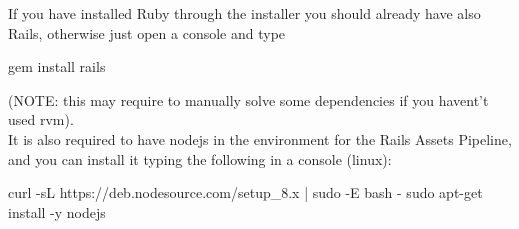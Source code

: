 If you have installed Ruby through the installer you should already have also Rails, otherwise just open a console and type 
\begin{commandshell}gem install rails\end{commandshell} 
(NOTE: this may require to manually solve some dependencies if you havent't used rvm). \\
It is also required to have nodejs in the environment for the Rails Assets Pipeline, and you can install it typing the following in a console (linux): \\

\begin{commandshell}
curl -sL https://deb.nodesource.com/setup_8.x | sudo -E bash -
sudo apt-get install -y nodejs
\end{commandshell}